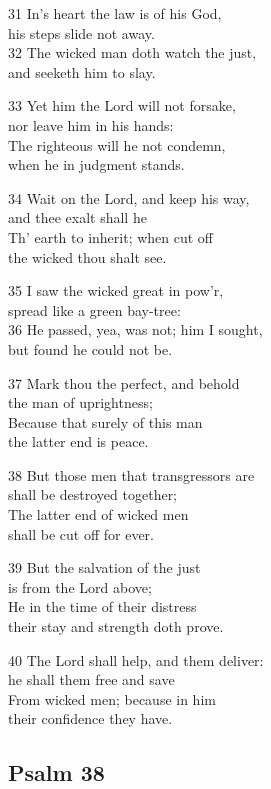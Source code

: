 31 In’s heart the law is of his God,\\
his steps slide not away.\\
32 The wicked man doth watch the just,\\
and seeketh him to slay.

33 Yet him the Lord will not forsake,\\
nor leave him in his hands:\\
The righteous will he not condemn,\\
when he in judgment stands.

34 Wait on the Lord, and keep his way,\\
and thee exalt shall he\\
Th’ earth to inherit; when cut off\\
the wicked thou shalt see.

35 I saw the wicked great in pow’r,\\
spread like a green bay-tree:\\
36 He passed, yea, was not; him I sought,\\
but found he could not be.

37 Mark thou the perfect, and behold\\
the man of uprightness;\\
Because that surely of this man\\
the latter end is peace.

38 But those men that transgressors are\\
shall be destroyed together;\\
The latter end of wicked men\\
shall be cut off for ever.

39 But the salvation of the just\\
is from the Lord above;\\
He in the time of their distress\\
their stay and strength doth prove.

40 The Lord shall help, and them deliver:\\
he shall them free and save\\
From wicked men; because in him\\
their confidence they have.

\begin{center}
\quad{}\quad{}
\end{center}

\subsection*{Psalm 38}

